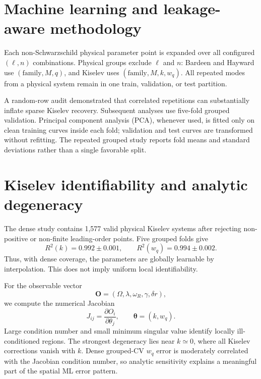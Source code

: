 \documentclass[11pt]{article}
\begin{document}
\section{Machine learning and leakage-aware methodology}

Each non-Schwarzschild physical parameter point is expanded over all configured
$(\ell,n)$ combinations.  Physical groups exclude $\ell$ and $n$: Bardeen and
Hayward use $(\mathrm{family},M,q)$, and Kiselev uses
$(\mathrm{family},M,k,w_q)$.  All repeated modes from a physical system remain in
one train, validation, or test partition.

A random-row audit demonstrated that correlated repetitions can substantially
inflate sparse Kiselev recovery.  Subsequent analyses use five-fold grouped
validation.  Principal component analysis (PCA), whenever used, is fitted only on
clean training curves inside each fold; validation and test curves are transformed
without refitting.  The repeated grouped study reports fold means and standard
deviations rather than a single favorable split.

\section{Kiselev identifiability and analytic degeneracy}

The dense study contains 1,577 valid physical Kiselev systems after rejecting
non-positive or non-finite leading-order points.  Five grouped folds give
\begin{equation}
 R^2(k)=0.992\pm0.001,\qquad
 R^2(w_q)=0.994\pm0.002.
\end{equation}
Thus, with dense coverage, the parameters are globally learnable by interpolation.
This does not imply uniform local identifiability.

For the observable vector
\begin{equation}
\mathbf O=(\Omega,\lambda,\omega_R,\gamma,\delta r),
\end{equation}
we compute the numerical Jacobian
\begin{equation}
J_{ij}=\frac{\partial O_i}{\partial\theta_j},\qquad
\boldsymbol\theta=(k,w_q).
\end{equation}
Large condition number and small minimum singular value identify locally
ill-conditioned regions.  The strongest degeneracy lies near $k\simeq0$, where all
Kiselev corrections vanish with $k$.  Dense grouped-CV $w_q$ error is moderately
correlated with the Jacobian condition number, so analytic sensitivity explains a
meaningful part of the spatial ML error pattern.
\end{document}
